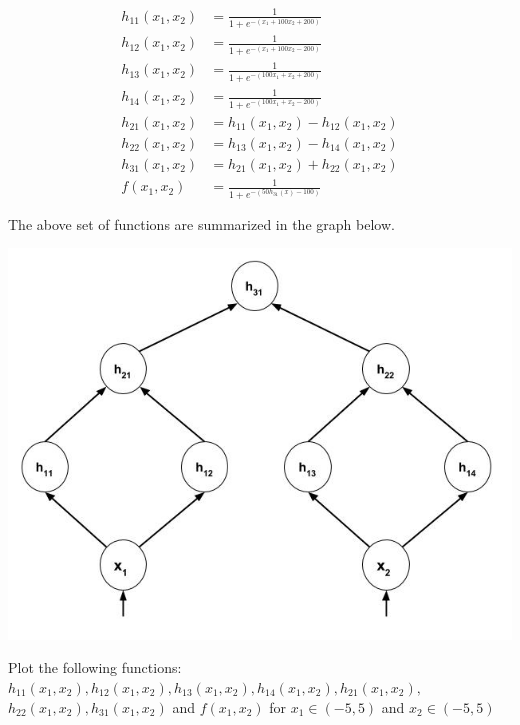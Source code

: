\documentclass[solution,addpoints,12pt]{exam}
\begin{document}
\begin{questions}
\begin{parts}
                  \begin{align*}
                    h_{11}(x_1, x_2) &= \frac{1}{1 + e^{-(x_1 + 100x_2 + 200)}}  \\
                    h_{12}(x_1, x_2) &= \frac{1}{1 + e^{-(x_1 + 100x_2 - 200)}}  \\
                    h_{13}(x_1, x_2) &= \frac{1}{1 + e^{-(100x_1 + x_2 + 200)}}  \\
                    h_{14}(x_1, x_2) &= \frac{1}{1 + e^{-(100x_1 + x_2 - 200)}}  \\
                    h_{21}(x_1, x_2) &= h_{11}(x_1, x_2) - h_{12}(x_1, x_2)\\
                    h_{22}(x_1, x_2) &= h_{13}(x_1, x_2) - h_{14}(x_1, x_2)\\
                    h_{31}(x_1, x_2) &= h_{21}(x_1, x_2) + h_{22}(x_1, x_2)\\
                    f(x_1, x_2) &= \frac{1}{1 + e^{-(50h_{31}(x) - 100)}}  \\\\
                  \end{align*}
                  The above set of functions are summarized in the graph below.
                    \begin{center}
            		\includegraphics[scale=0.35]{sig3d}
          		  \end{center} 
                  Plot the following functions: $h_{11}(x_1, x_2), h_{12}(x_1, x_2), h_{13}(x_1, x_2), h_{14}(x_1, x_2), h_{21}(x_1, x_2),$ $h_{22}(x_1, x_2), h_{31}(x_1, x_2)$ and $f(x_1, x_2)$ for $x_1 \in (-5, 5)$ and $x_2 \in (-5, 5)$

\end{parts}
\end{questions}
\end{document}

